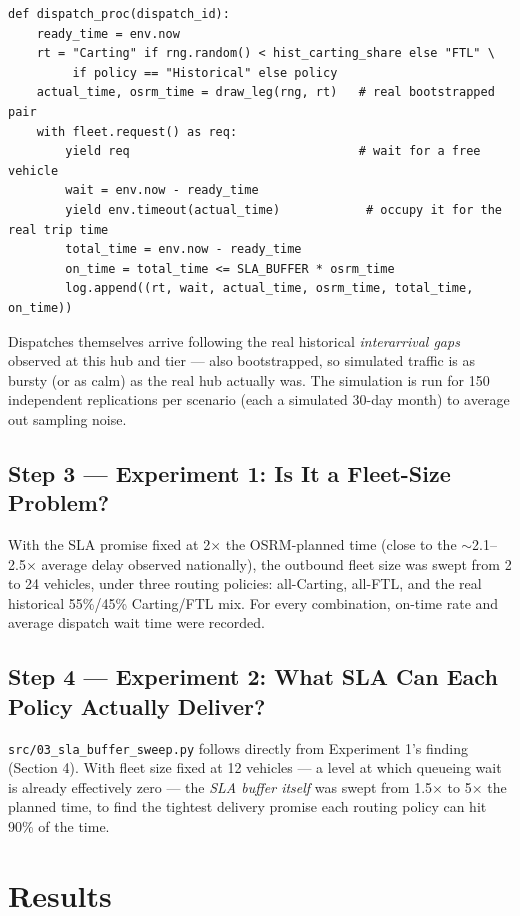 \documentclass[10.5pt,a4paper]{article}
\begin{document}
\begin{lstlisting}
def dispatch_proc(dispatch_id):
    ready_time = env.now
    rt = "Carting" if rng.random() < hist_carting_share else "FTL" \
         if policy == "Historical" else policy
    actual_time, osrm_time = draw_leg(rng, rt)   # real bootstrapped pair
    with fleet.request() as req:
        yield req                                # wait for a free vehicle
        wait = env.now - ready_time
        yield env.timeout(actual_time)            # occupy it for the real trip time
        total_time = env.now - ready_time
        on_time = total_time <= SLA_BUFFER * osrm_time
        log.append((rt, wait, actual_time, osrm_time, total_time, on_time))
\end{lstlisting}

Dispatches themselves arrive following the real historical \emph{interarrival gaps} observed at this hub and tier --- also bootstrapped, so simulated traffic is as bursty (or as calm) as the real hub actually was. The simulation is run for 150 independent replications per scenario (each a simulated 30-day month) to average out sampling noise.

\subsection{Step 3 --- Experiment 1: Is It a Fleet-Size Problem?}

With the SLA promise fixed at 2$\times$ the OSRM-planned time (close to the $\sim$2.1--2.5$\times$ average delay observed nationally), the outbound fleet size was swept from 2 to 24 vehicles, under three routing policies: all-Carting, all-FTL, and the real historical 55\%/45\% Carting/FTL mix. For every combination, on-time rate and average dispatch wait time were recorded.

\subsection{Step 4 --- Experiment 2: What SLA Can Each Policy Actually Deliver?}

\texttt{src/03\_sla\_buffer\_sweep.py} follows directly from Experiment 1's finding (Section 4). With fleet size fixed at 12 vehicles --- a level at which queueing wait is already effectively zero --- the \emph{SLA buffer itself} was swept from 1.5$\times$ to 5$\times$ the planned time, to find the tightest delivery promise each routing policy can hit 90\% of the time.

\section{Results}
\end{document}
